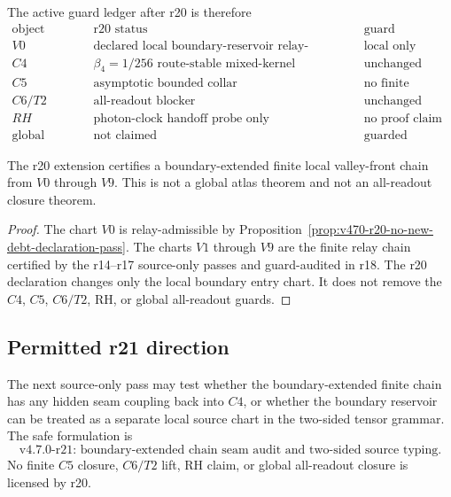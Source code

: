 The active guard ledger after r20 is therefore
\[
\boxed{
\begin{array}{c|c|c}
\text{object} & \text{r20 status} & \text{guard}\\
\hline
V0 & \text{declared local boundary-reservoir relay-admissible} & \text{local only}\\
C4 & \beta_4=1/256\text{ route-stable mixed-kernel} & \text{unchanged}\\
C5 & \text{asymptotic bounded collar} & \text{no finite closure}\\
C6/T2 & \text{all-readout blocker} & \text{unchanged}\\
RH & \text{photon-clock handoff probe only} & \text{no proof claim}\\
\text{global closure} & \text{not claimed} & \text{guarded}
\end{array}
}
\]

\begin{corollary}
\label{cor:v470-r20-boundary-extended-local-coverage}
The r20 extension certifies a boundary-extended finite local valley-front chain
from \(V0\) through \(V9\).  This is not a global atlas theorem and not an
all-readout closure theorem.
\end{corollary}

\begin{proof}
The chart \(V0\) is relay-admissible by
Proposition~\ref{prop:v470-r20-no-new-debt-declaration-pass}.  The charts
\(V1\) through \(V9\) are the finite relay chain certified by the r14--r17
source-only passes and guard-audited in r18.  The r20 declaration changes only
the local boundary entry chart.  It does not remove the \(C4\), \(C5\),
\(C6/T2\), RH, or global all-readout guards.
\end{proof}

\subsection{Permitted r21 direction}
\label{subsec:v470-r20-permitted-r21-direction}

The next source-only pass may test whether the boundary-extended finite chain
has any hidden seam coupling back into \(C4\), or whether the boundary reservoir
can be treated as a separate local source chart in the two-sided tensor grammar.
The safe formulation is
\[
\boxed{
\text{v4.7.0-r21: boundary-extended chain seam audit and two-sided source typing.}
}
\]
No finite \(C5\) closure, \(C6/T2\) lift, RH claim, or global all-readout
closure is licensed by r20.


